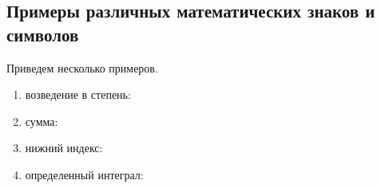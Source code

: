 \newpage
\subsection{Примеры различных математических знаков и символов}

Приведем несколько примеров.

\begin{enumerate}
\item возведение в степень:	
%
\item сумма:
\item нижний индекс:
%
\item определенный интеграл:
\end{enumerate}	

